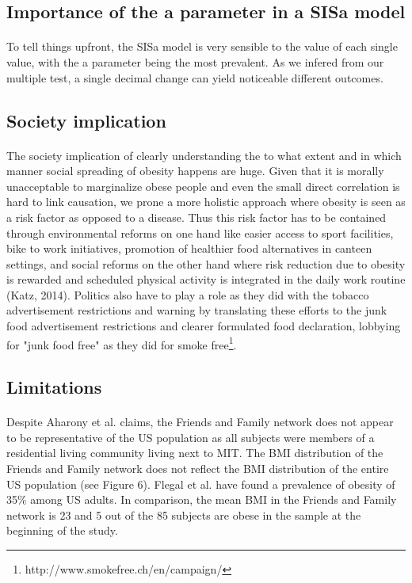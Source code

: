 \documentclass[11pt]{article}
\begin{document}
\subsection{Importance of the a parameter in a SISa model}
\paragraph{}
To tell things upfront, the SISa model is very sensible to the value of each single value, with the a parameter being the most prevalent. As we infered from our multiple test, a single decimal change can yield noticeable different outcomes.



\subsection{Society implication}
\paragraph{}
The society implication of clearly understanding the to what extent and in which manner social spreading of obesity happens are huge. Given that it is morally unacceptable to marginalize obese people and even the small direct correlation is hard to link causation, we prone a more holistic approach where obesity is seen as a risk factor as opposed to a disease. Thus this risk factor has to be contained through environmental reforms on one hand like easier access to sport facilities, bike to work initiatives, promotion of healthier food alternatives in canteen settings, and social reforms on the other hand where risk reduction due to obesity is rewarded and scheduled physical activity is integrated in the daily work routine (Katz, 2014). Politics also have to play a role as they did with the tobacco advertisement restrictions and warning by translating these efforts to the junk food advertisement restrictions and clearer formulated food declaration, lobbying for "junk food free" as they did for smoke free\footnote{http://www.smokefree.ch/en/campaign/}.

\subsection{Limitations}
\paragraph{}
Despite Aharony et al. claims, the Friends and Family network does not appear to be representative of the US population as all subjects were members of a residential living community living next to MIT. The BMI distribution of the Friends and Family network does not reflect the BMI distribution of the entire US population (see Figure 6). Flegal et al. have found a prevalence of obesity of 35\% among US adults. In comparison, the mean BMI in the Friends and Family network is 23 and 5 out of the 85 subjects are obese in the sample at the beginning of the study.
\end{document}
